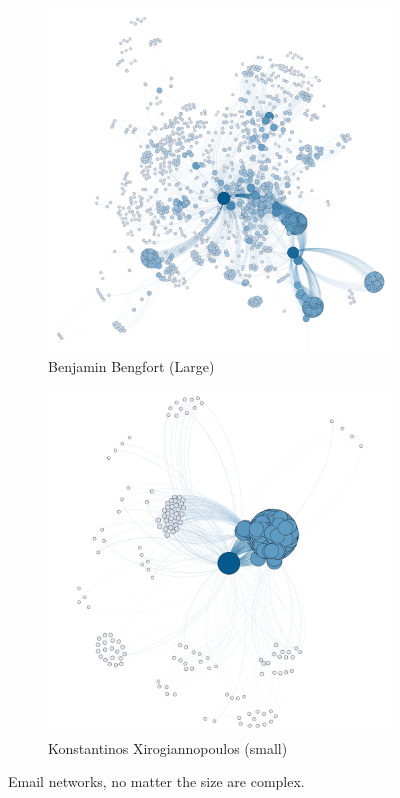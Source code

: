 \documentclass[11pt,letterpaper]{article}
\begin{document}
\begin{figure}[h]
	\centering
	\begin{subfigure}{0.49\textwidth}
		\centering
		\includegraphics[width=\textwidth]{figures/benjamin_descriptive.png}
		\caption{\textsf{Benjamin Bengfort (Large)}}
        \label{fig:benjamin_descriptive}
	\end{subfigure} \hfill
	\begin{subfigure}{0.49\textwidth}
		\centering
		\includegraphics[width=\textwidth]{figures/kostas_descriptive.png}
		\caption{\textsf{Konstantinos Xirogiannopoulos (small)}}
        \label{fig:kostas_descriptive}
	\end{subfigure}
    \caption{\textsf{Email networks, no matter the size are complex.}}
    \label{fig:descriptive}
\end{figure}
\end{document}
